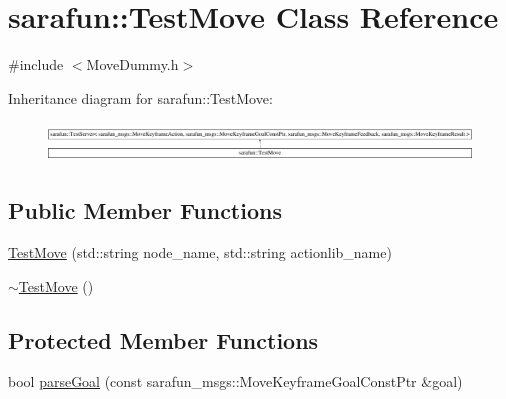 \hypertarget{classsarafun_1_1TestMove}{\section{sarafun\-:\-:Test\-Move Class Reference}
\label{classsarafun_1_1TestMove}
}


{\ttfamily \#include $<$Move\-Dummy.\-h$>$}

Inheritance diagram for sarafun\-:\-:Test\-Move\-:\begin{figure}[H]
\begin{center}
\leavevmode
\includegraphics[height=1.054614cm]{classsarafun_1_1TestMove}
\end{center}
\end{figure}
\subsection*{Public Member Functions}
\begin{DoxyCompactItemize}
\item 
\hyperlink{classsarafun_1_1TestMove_ae9653a964d20cf520a9a9f51c73df36b}{Test\-Move} (std\-::string node\-\_\-name, std\-::string actionlib\-\_\-name)
\item 
\hyperlink{classsarafun_1_1TestMove_a5e1d99c97f17c188913a0d8d6d1de927}{$\sim$\-Test\-Move} ()
\end{DoxyCompactItemize}
\subsection*{Protected Member Functions}
\begin{DoxyCompactItemize}
\item 
bool \hyperlink{classsarafun_1_1TestMove_aa5af16aa1c4d8e9347dddf8b15106aa1}{parse\-Goal} (const sarafun\-\_\-msgs\-::\-Move\-Keyframe\-Goal\-Const\-Ptr \&goal)
\end{DoxyCompactItemize}


